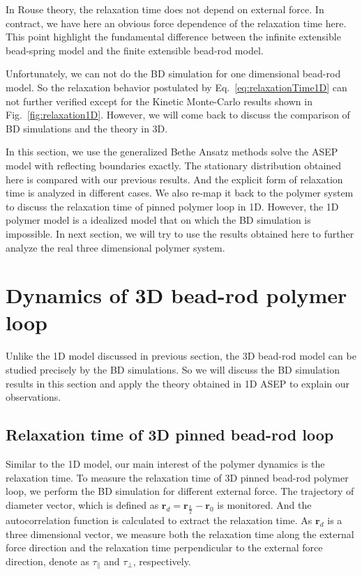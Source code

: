 In Rouse theory, the relaxation time does not depend on external force. In contract, we have here an obvious force dependence of the relaxation time here. This point highlight the fundamental difference between the infinite extensible bead-spring model and the finite extensible bead-rod model.

Unfortunately, we can not do the BD simulation for one dimensional bead-rod model. So the relaxation behavior postulated by Eq.~\eqref{eq:relaxationTime1D} can not further verified except for the Kinetic Monte-Carlo results shown in Fig.~\ref{fig:relaxation1D}. However, we will come back to discuss the comparison of BD simulations and the theory in 3D.

In this section, we use the generalized Bethe Ansatz methods solve the ASEP model with reflecting boundaries exactly.  The stationary distribution obtained here is compared with our previous results. And the explicit form of relaxation time is analyzed in different cases. We also re-map it back to the polymer system to discuss the relaxation time of pinned polymer loop in 1D. However, the 1D polymer model is a idealized model that on which the BD simulation is impossible. In next section, we will try to use the results obtained here to further analyze the real three dimensional polymer system.



\section{Dynamics of 3D bead-rod polymer loop}
\label{sec:dynamics_of_3d_bead_rod_polymer_loop}

Unlike the 1D model discussed in previous section, the 3D bead-rod model can be studied precisely by the BD simulations. So we will discuss the BD simulation results in this section and apply the theory obtained in 1D ASEP to explain our observations.

\subsection{Relaxation time of 3D pinned bead-rod loop}
\label{sub:relaxation_time_of_3d_pinned_bead_rod_loop}

Similar to the 1D model, our main interest of the polymer dynamics is the relaxation time. To measure the relaxation time of 3D pinned bead-rod polymer loop, we perform the BD simulation for different external force. The trajectory of diameter vector, which is defined as $\mathbf{r}_d = \mathbf{r}_{\frac{L}{2}} - \mathbf{r}_0$ is monitored. And the autocorrelation function is calculated to extract the relaxation time. 
As $\mathbf{r}_d$ is a three dimensional vector, we measure both the relaxation time along the external force direction and the relaxation time perpendicular to the external force direction, denote as $\tau_{\parallel}$ and $\tau_{\perp}$, respectively.

